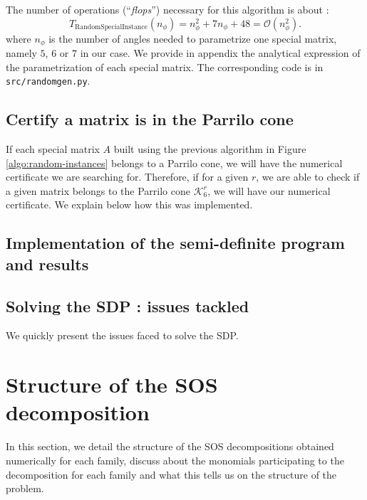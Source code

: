 \documentclass[onecolumn,11pt,a4paper]{article}
\theoremstyle{plain}  %
\theoremstyle{remark}  %
\begin{document}
The number of operations (``\emph{flops}'') necessary for this algorithm is about :
\begin{equation}
	\label{eq:complexity_randomgen}
	T_{\mathrm{RandomSpecialInstance}}(n_\phi) =  n_\phi^2 + 7 n_\phi + 48 = \mathcal{O}(n_\phi^2).
\end{equation}
where $n_\phi$ is the number of angles needed to parametrize one special matrix, namely $5$, $6$ or $7$ in our case.
We provide in appendix the analytical expression of the parametrization of each special matrix.
The corresponding code is in \texttt{src/randomgen.py}.
\subsection{Certify a matrix is in the Parrilo cone}
\label{sub:parrilo-certificate}
If each special matrix $A$ built using the previous algorithm in Figure \ref{algo:random-instances}
belongs to a Parrilo cone, we will have the numerical certificate we are searching for.
Therefore, if for a given $r$, we are able to check if a given matrix belongs to the Parrilo cone $\mathcal{K}_6^r$,
we will have our numerical certificate. We explain below how this was implemented.
\subsection{Implementation of the semi-definite program and results}
\label{sub:sdp}
\subsection{Solving the SDP : issues tackled}
\label{sub:solving-issues}
We quickly present the issues faced to solve the SDP.
\section{Structure of the SOS decomposition}
\label{sec:sos-structure}
In this section, we detail the structure of the SOS decompositions obtained numerically for each family,
discuss about the monomials participating to the decomposition for each family and what this tells us on
the structure of the problem.
\end{document}

